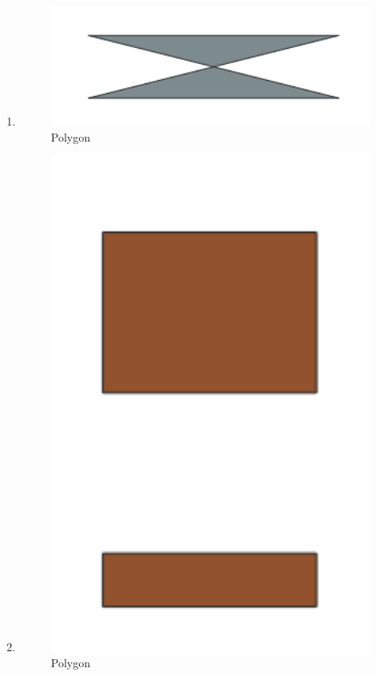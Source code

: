 \begin{enumerate}
	\item 
	
	\begin{figure}[H]
		\includegraphics[width=12cm]{figures/1174008/2/hasilsoal8.PNG}
		\centering
		\caption{Polygon}
	\end{figure}
	
	\item 
	
	\begin{figure}[H]
		\includegraphics[width=12cm]{figures/1174008/2/hasilsoal9.PNG}
		\centering
		\caption{Polygon}
	\end{figure}


\end{enumerate}
